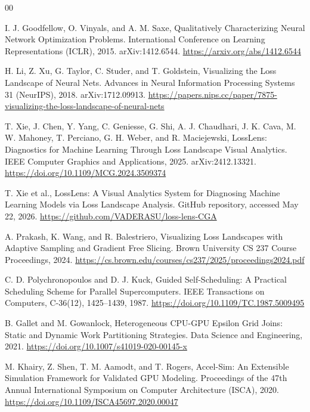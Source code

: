 \documentclass[conference]{IEEEtran}
\begin{document}
\begin{thebibliography}{00}

I. J. Goodfellow, O. Vinyals, and A. M. Saxe, Qualitatively
Characterizing Neural Network Optimization Problems.
International Conference on Learning Representations (ICLR),
2015. arXiv:1412.6544.
\url{https://arxiv.org/abs/1412.6544}

H. Li, Z. Xu, G. Taylor, C. Studer, and T. Goldstein,
Visualizing the Loss Landscape of Neural Nets. Advances in
Neural Information Processing Systems 31 (NeurIPS), 2018.
arXiv:1712.09913.
\url{https://papers.nips.cc/paper/7875-visualizing-the-loss-landscape-of-neural-nets}

T. Xie, J. Chen, Y. Yang, C. Geniesse, G. Shi, A. J. Chaudhari, J. K.
Cava, M. W. Mahoney, T. Perciano, G. H. Weber, and R. Maciejewski,
LossLens: Diagnostics for Machine Learning Through Loss Landscape
Visual Analytics. IEEE Computer Graphics and Applications, 2025.
arXiv:2412.13321.
\url{https://doi.org/10.1109/MCG.2024.3509374}

T. Xie et al., LossLens: A Visual Analytics System for Diagnosing
Machine Learning Models via Loss Landscape Analysis. GitHub
repository, accessed May 22, 2026.
\url{https://github.com/VADERASU/loss-lens-CGA}

A. Prakash, K. Wang, and R. Balestriero,
Visualizing Loss Landscapes with Adaptive Sampling and
Gradient Free Slicing. Brown University CS 237 Course
Proceedings, 2024.
\url{https://cs.brown.edu/courses/cs237/2025/proceedings2024.pdf}

C. D. Polychronopoulos and D. J. Kuck, Guided Self-Scheduling: A
Practical Scheduling Scheme for Parallel Supercomputers. IEEE
Transactions on Computers, C-36(12), 1425--1439, 1987.
\url{https://doi.org/10.1109/TC.1987.5009495}

B. Gallet and M. Gowanlock, Heterogeneous CPU-GPU Epsilon Grid
Joins: Static and Dynamic Work Partitioning Strategies. Data Science
and Engineering, 2021.
\url{https://doi.org/10.1007/s41019-020-00145-x}

M. Khairy, Z. Shen, T. M. Aamodt, and T. Rogers, Accel-Sim: An
Extensible Simulation Framework for Validated GPU Modeling. Proceedings
of the 47th Annual International Symposium on Computer Architecture
(ISCA), 2020. \url{https://doi.org/10.1109/ISCA45697.2020.00047}


\end{thebibliography}
\end{document}
